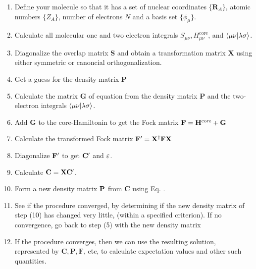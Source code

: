 \documentclass[11pt]{article}
\begin{document}
\begin{enumerate}
	\item Define your molecule so that it has a set of nuclear coordinates $\{\mathbf{R}_A\}$, atomic numbers $\{Z_A\}$, number of electrons $N$ and a basis set $\{\phi_\mu\}$. 
	\item Calculate all molecular one and two electron integrals $S_{\mu\nu}, H_{\mu\nu}^{\text{core}}$, and $\ip{\mu\nu}{\lambda \sigma}$.  
	\item Diagonalize the overlap matrix $\mathbf{S}$ and obtain a transformation matrix $\mathbf{X}$ using either symmetric or canoncial orthogonalization. 
	\item Get a guess for the density matrix $\mathbf{P}$
	\item Calculate the matrix $ \mathbf{G} $ of equation from the density matrix \textbf{P} and the two-electron integrals $ \ip{\mu \nu }{ \lambda \sigma }$.
	\item Add \textbf{G} to the core-Hamiltonin to get the Fock matrix $ \bf F = H^{\rm core} + \bf G $ 
	\item Calculate the transformed Fock matrix $ \bf F' = X^\dagger F X $
	\item Diagonalize $ \bf F'$ to get $ \bf C' $ and $ \varepsilon $. 
	\item Calculate $ \bf C = XC'  $. 
	\item Form a new density matrix $ \bf P $ from \textbf{C} using Eq. .
	\item  See if the procedure converged, by determining if the new density matrix of step (10) has changed very little, (within a specified criterion). If no convergence, go back to step (5) with the new density matrix
	\item If the procedure converges, then we can use the resulting solution, represented by $ \mathbf{C}, \mathbf{P}, \mathbf{F}$, etc, to calculate expectation values and other such quantities. 
\end{enumerate}
\end{document}
